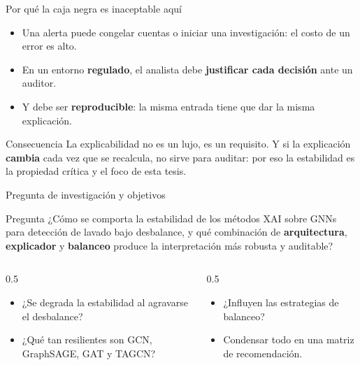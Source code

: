 \documentclass[aspectratio=169,11pt]{beamer}
\begin{document}
\begin{frame}{Por qué la caja negra es inaceptable aquí}
\begin{itemize}
  \item Una alerta puede \alert{congelar cuentas} o iniciar una investigación: el costo de un error es alto.
  \item En un entorno \textbf{regulado}, el analista debe \textbf{justificar cada decisión} ante un auditor.
  \item Y debe ser \textbf{reproducible}: la misma entrada tiene que dar la misma explicación.
\end{itemize}
\vspace{0.5em}
\begin{block}{Consecuencia}
La explicabilidad no es un lujo, es un \alert{requisito}. Y si la explicación \textbf{cambia} cada vez que se recalcula, no sirve para auditar: por eso la \alert{estabilidad} es la propiedad crítica y el foco de esta tesis.
\end{block}
\end{frame}

\begin{frame}{Pregunta de investigación y objetivos}
\begin{block}{Pregunta}
¿Cómo se comporta la \alert{estabilidad} de los métodos XAI sobre GNNs para detección de lavado bajo desbalance, y qué combinación de \textbf{arquitectura}, \textbf{explicador} y \textbf{balanceo} produce la interpretación más robusta y auditable?
\end{block}
\vspace{0.4em}
\begin{columns}[T]
\begin{column}{0.5\textwidth}
\begin{itemize}\small
  \item[\textcolor{amber}{\textbf{O1}}] ¿Se degrada la estabilidad al agravarse el desbalance?
  \item[\textcolor{amber}{\textbf{O2}}] ¿Qué tan resilientes son GCN, GraphSAGE, GAT y TAGCN?
\end{itemize}
\end{column}
\begin{column}{0.5\textwidth}
\begin{itemize}\small
  \item[\textcolor{amber}{\textbf{O3}}] ¿Influyen las estrategias de balanceo?
  \item[\textcolor{amber}{\textbf{O4}}] Condensar todo en una matriz de recomendación.
\end{itemize}
\end{column}
\end{columns}
\end{frame}
\end{document}
